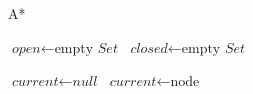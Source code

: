 \def\BState{\State\hskip-\ALG@thistlm}

\begin{algorithm}
\caption{A*}\label{euclid}
\begin{algorithmic}[1]
\State $\textit{open} \gets \text{empty }\textit{Set}$
\State $\textit{closed} \gets \text{empty }\textit{Set}$

    \State $\textit{current} \gets \textit{null}$
            \State $\textit{current} \gets \text{node}$
        \EndIf
    \EndFor
\EndWhile

\EndProcedure
\end{algorithmic}
\end{algorithm}


%
%
%

%
%

